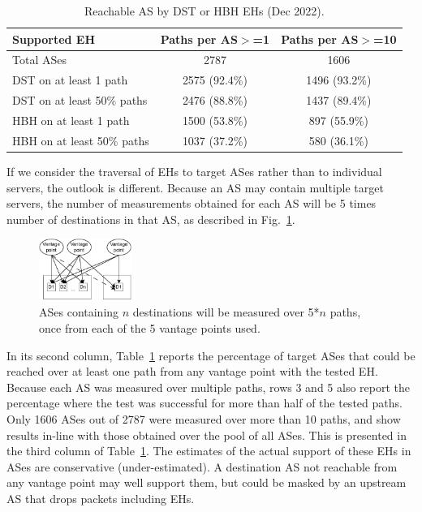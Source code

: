 \documentclass[conference]{IEEEtran}
\begin{document}
\begin{table}
\caption{Reachable AS by DST or HBH EHs (Dec 2022).}
\begin{tabular}{l|c|c}
Supported EH                & Paths per AS$>$=1 & Paths per AS$>$=10 \\
\hline \hline
Total  ASes                 & 2787              & 1606 \\
\hline
DST on at least 1 path      & 2575 (92.4\%)     & 1496 (93.2\%)      \\
DST on at least 50\% paths  & 2476 (88.8\%)     & 1437 (89.4\%)      \\ \hline
HBH on at least 1 path      & 1500 (53.8\%)      & 897 (55.9\%)      \\
HBH on at least 50\% paths  & 1037 (37.2\%)      & 580 (36.1\%)  
\end{tabular}
\label{tbl:as_pathspider}
\end{table}

If we consider the traversal of EHs to target ASes rather than to individual
servers, the outlook is different. Because an AS may contain multiple target servers, the number of measurements obtained for each AS will be 5 times number of destinations in that AS, as described in Fig.~\ref{fig:pspdr-AS}.
\begin{figure}[t]
\centering
  \includegraphics[width=0.27\textwidth]{pathspider-test-1.pdf}
  \caption{ASes containing $n$ destinations will be measured over 5*$n$ paths, once from each of the 5 vantage points used.}
  \label{fig:pspdr-AS}
\end{figure}
In its second column, Table~\ref{tbl:as_pathspider} reports the
percentage of target ASes that could be reached over at least one path from any vantage point with the tested EH. Because each AS was measured over multiple paths, rows 3 and 5 also report the percentage where the test was successful for more than half of the tested paths.
Only 1606 ASes out of 2787 were measured over more than 10 paths, and show results in-line with those obtained over the pool of all ASes. This is presented in the third column of Table~\ref{tbl:as_pathspider}.
The estimates of the actual support of these EHs in ASes are conservative (under-estimated). A destination AS not reachable from any vantage point may well support them, but could be masked by an upstream AS that drops packets including EHs.
\end{document}
